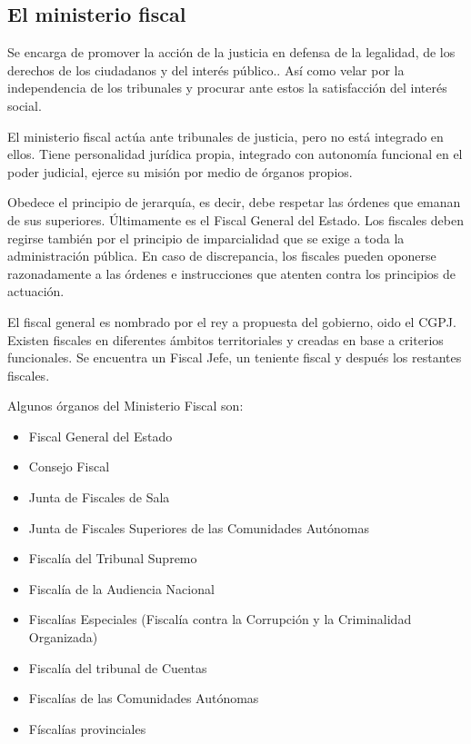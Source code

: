 \subsection{El ministerio fiscal} %
    Se encarga de promover la acción de la justicia en defensa de la legalidad, de los derechos de los ciudadanos y del interés público.. Así como velar por la independencia de los tribunales y procurar ante estos la satisfacción del interés social.

    El ministerio fiscal actúa ante tribunales de justicia, pero no está integrado en ellos. Tiene personalidad jurídica propia, integrado con autonomía funcional en el poder judicial, ejerce su misión por medio de órganos propios.

    Obedece el principio de jerarquía, es decir, debe respetar las órdenes que emanan de sus superiores. Últimamente es el Fiscal General del Estado. Los fiscales deben regirse también por el principio de imparcialidad que se exige a toda la administración pública. En caso de discrepancia, los fiscales pueden oponerse razonadamente a las órdenes e instrucciones que atenten contra los principios de actuación.

    El fiscal general es nombrado por el rey a propuesta del gobierno, oido el CGPJ. Existen fiscales en diferentes ámbitos territoriales y creadas en base a criterios funcionales. Se encuentra un Fiscal Jefe, un teniente fiscal y después los restantes fiscales.

    Algunos órganos del Ministerio Fiscal son:
    \begin{itemize}
        \item Fiscal General del Estado
        \item Consejo Fiscal
        \item Junta de Fiscales de Sala
        \item Junta de Fiscales Superiores de las Comunidades Autónomas
        \item Fiscalía del Tribunal Supremo
        \item Fiscalía de la Audiencia Nacional
        \item Fiscalías Especiales (Fiscalía contra la Corrupción y la Criminalidad Organizada)
        \item Fiscalía del tribunal de Cuentas
        \item Fiscalías de las Comunidades Autónomas
        \item Físcalías provinciales
    \end{itemize}

